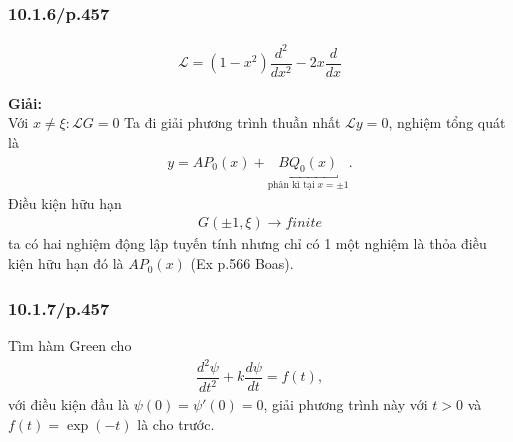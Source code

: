 \documentclass{report}
\newcommand{\f}[2]{\dfrac{#1}{#2}}
\begin{document}
\subsubsection{10.1.6/p.457}
\begin{align*}
	\mathcal{L} = (1 - x^2) \f{d^2}{dx^2} - 2x \f{d}{dx}
\end{align*}

\textbf{Giải:}\\
Với $x\neq \xi: \mathcal{L} G = 0$
Ta đi giải phương trình thuần nhất $\mathcal{L} y =0 $, nghiệm tổng quát là
\begin{align*}
	y = A P_0(x) + \underbracket{B Q_0(x)}_{\text{phân kì tại}\; x = \pm 1}.
\end{align*}
Điều kiện hữu hạn
\begin{align*}
	G(\pm 1,\xi) \rightarrow finite
\end{align*}
ta có hai nghiệm động lập tuyến tính nhưng chỉ có 1 một nghiệm là thỏa điều kiện hữu hạn đó là $A P_0(x)$ (Ex p.566 Boas).


\subsubsection{10.1.7/p.457}
Tìm hàm Green cho
\begin{align*}
	\f{d^2 \psi}{dt^2} + k \f{d\psi}{dt} = f(t),
\end{align*}
với điều kiện đầu là $\psi(0) = \psi'(0) = 0$, giải phương trình này với $t > 0$ và $f(t) = \exp(-t)$ là cho trước. \\
\end{document}
